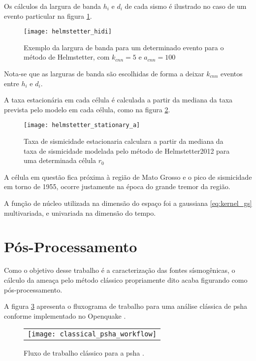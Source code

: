 Os cálculos da largura de banda $h_i$ e $d_i$ de cada sismo é ilustrado no caso de um evento particular na figura
\ref{fig:h_hidi}.

\begin{figure}[H]
  \centering
  \texttt{[image: helmstetter\_hidi]} 
  \caption{Exemplo da largura de banda para um determinado evento para o método de Helmstetter, com $k_{cnn} = 5$ e
  $a_{cnn} = 100$}
  \label{fig:h_hidi} 
\end{figure}

Nota-se que as larguras de banda são escolhidas de forma a deixar $k_{cnn}$ eventos entre $h_i$ e $d_i$.

A taxa estacionária em cada célula é calculada a partir da mediana da taxa prevista pelo modelo em cada célula,
como na figura \ref{fig:h_stationary}.
\begin{figure}[H]
  \centering
  \texttt{[image: helmstetter\_stationary\_a]} 
  \caption{Taxa de sismicidade estacionaria calculara a partir da mediana da taxa de sismicidade
  modelada pelo método de Helmstetter2012 para uma determinada célula $r_0$}
  \label{fig:h_stationary} 
\end{figure}
A célula em questão fica próxima à região de Mato Grosso e o pico de sismicidade em torno de 1955,
ocorre justamente na época do grande tremor da região.

A função de núcleo utilizada na dimensão do espaço foi a gaussiana \eqref{eq:kernel_gs} multivariada, 
e univariada na dimensão do tempo.

\section{Pós-Processamento}
\label{sec:pos_proc}

Como o objetivo desse trabalho é a caracterização das fontes sísmogênicas,
o cálculo da ameaça pelo método clássico propriamente dito
acaba figurando como pós-processamento.

A figura \ref{fig:classical_psha} apresenta o fluxograma de trabalho para uma análise clássica de \gls{psha} conforme
implementado no Openquake \citep{pagani_2010, weatherill_2012}.

\begin{figure}[H]
	\centering
	\begin{tabular}{l}
	\texttt{[image: classical\_psha\_workflow]}
	\end{tabular}
	\caption{Fluxo de trabalho clássico para a \gls{psha} \citep{crowley_2013}.}
\label{fig:classical_psha}
\end{figure}
